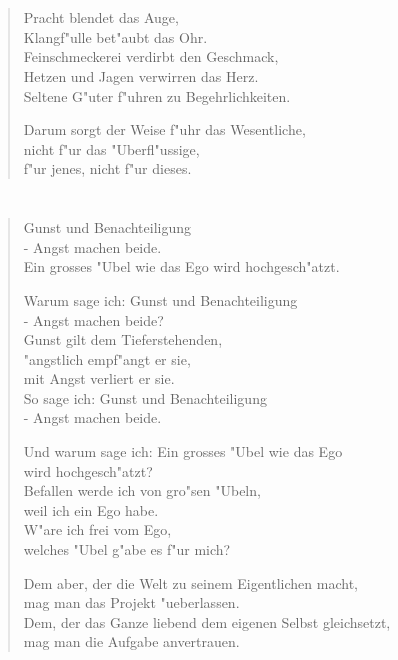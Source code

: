 \documentclass[a4paper,10pt,openany]{book}
\begin{document}
\chapter{}
\begin{verse}
    Pracht blendet das Auge,\\
    Klangf"ulle bet"aubt das Ohr.\\
    Feinschmeckerei verdirbt den Geschmack,\\
    Hetzen und Jagen verwirren das Herz.\\
    Seltene G"uter f"uhren zu Begehrlichkeiten.

    Darum sorgt der Weise f"uhr das Wesentliche,\\
    nicht f"ur das "Uberfl"ussige,\\
    f"ur jenes, nicht f"ur dieses.
\end{verse}

\chapter{}
\begin{verse}
    Gunst und Benachteiligung\\
    - Angst machen beide.\\
    Ein grosses "Ubel wie das Ego wird hochgesch"atzt.

    Warum sage ich: Gunst und Benachteiligung\\
    - Angst machen beide?\\
    Gunst gilt dem Tieferstehenden,\\
    "angstlich empf"angt er sie,\\
    mit Angst verliert er sie.\\
    So sage ich: Gunst und Benachteiligung\\
    - Angst machen beide.

    Und warum sage ich: Ein grosses "Ubel wie das Ego\\
    wird hochgesch"atzt?\\
    Befallen werde ich von gro"sen "Ubeln,\\
    weil ich ein Ego habe.\\
    W"are ich frei vom Ego,\\
    welches "Ubel g"abe es f"ur mich?

    Dem aber, der die Welt zu seinem Eigentlichen macht,\\
    mag man das Projekt "ueberlassen.\\
    Dem, der das Ganze liebend dem eigenen Selbst gleichsetzt,\\
    mag man die Aufgabe anvertrauen.
\end{verse}
\end{document}
